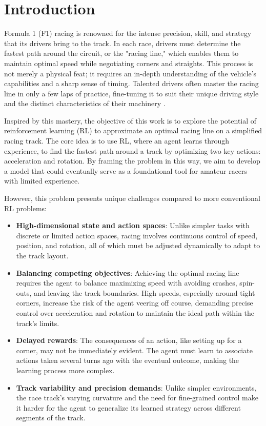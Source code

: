 \documentclass{article}
\begin{document}
\section{Introduction}

Formula 1 (F1) racing is renowned for the intense precision, skill, and strategy that its drivers bring to the track. In each race, drivers must determine the fastest path around the circuit, or the "racing line," which enables them to maintain optimal speed while negotiating corners and straights. This process is not merely a physical feat; it requires an in-depth understanding of the vehicle's capabilities and a sharp sense of timing. Talented drivers often master the racing line in only a few laps of practice, fine-tuning it to suit their unique driving style and the distinct characteristics of their machinery \cite{brouillard2016perfectcorner}.

Inspired by this mastery, the objective of this work is to explore the potential of reinforcement learning (RL) to approximate an optimal racing line on a simplified racing track. The core idea is to use RL, where an agent learns through experience, to find the fastest path around a track by optimizing two key actions: acceleration and rotation. By framing the problem in this way, we aim to develop a model that could eventually serve as a foundational tool for amateur racers with limited experience.

However, this problem presents unique challenges compared to more conventional RL problems:

\begin{itemize}
	\item \textbf{High-dimensional state and action spaces}: Unlike simpler tasks with discrete or limited action spaces, racing involves continuous control of speed, position, and rotation, all of which must be adjusted dynamically to adapt to the track layout.

	\item \textbf{Balancing competing objectives}: Achieving the optimal racing line requires the agent to balance maximizing speed with avoiding crashes, spin-outs, and leaving the track boundaries. High speeds, especially around tight corners, increase the risk of the agent veering off course, demanding precise control over acceleration and rotation to maintain the ideal path within the track’s limits.

	\item \textbf{Delayed rewards}: The consequences of an action, like setting up for a corner, may not be immediately evident. The agent must learn to associate actions taken several turns ago with the eventual outcome, making the learning process more complex.

	\item \textbf{Track variability and precision demands}: Unlike simpler environments, the race track’s varying curvature and the need for fine-grained control make it harder for the agent to generalize its learned strategy across different segments of the track.
\end{itemize}
\end{document}
